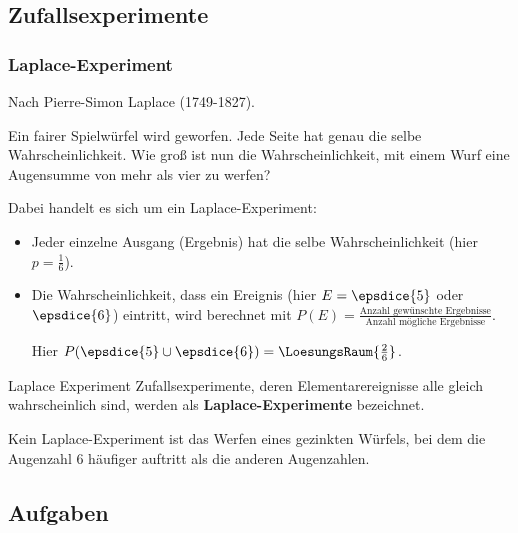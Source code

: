 
\subsection{Zufallsexperimente}

\subsubsection{Laplace-Experiment}
Nach Pierre-Simon Laplace (1749-1827).

Ein fairer Spielwürfel wird geworfen. Jede Seite hat genau die selbe
Wahrscheinlichkeit. Wie groß ist nun die Wahrscheinlichkeit, mit einem
Wurf eine Augensumme von mehr als vier zu werfen?


Dabei handelt es sich um ein Laplace-Experiment:
\begin{itemize}
\item Jeder einzelne Ausgang (Ergebnis) hat die selbe Wahrscheinlichkeit
      (hier $p = \frac{1}{6}$).
\item Die Wahrscheinlichkeit, dass ein Ereignis (hier $E = \epsdice{5}$
oder $\epsdice{6}$) eintritt, wird berechnet mit $P(E)
= \frac{\textrm{Anzahl gewünschte Ergebnisse}}{\textrm{Anzahl
mögliche Ergebnisse}}$.

Hier $P(\epsdice{5}\cup\epsdice{6}) = \LoesungsRaum{\frac{2}{6}}$.
\end{itemize}

\begin{definition}{Laplace Experiment}{}
  Zufallsexperimente, deren Elementarereignisse alle gleich wahrscheinlich sind, werden als
  \textbf{Laplace-Experimente} bezeichnet.
\end{definition}


Kein Laplace-Experiment ist \zB das Werfen eines gezinkten Würfels,
bei dem die Augenzahl 6 häufiger auftritt als die anderen Augenzahlen.

\subsection*{Aufgaben}


